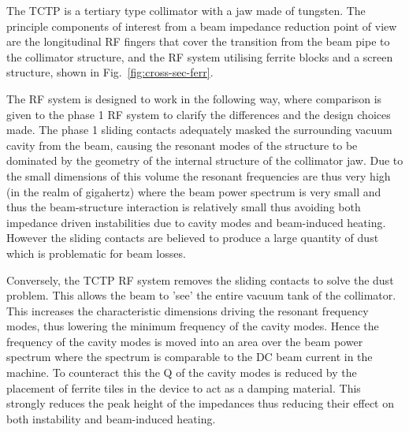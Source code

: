 The TCTP is a tertiary type collimator with a jaw made of tungsten. The principle components of interest from a beam impedance reduction point of view are the longitudinal RF fingers that cover the transition from the beam pipe to the collimator structure, and the RF system utilising ferrite blocks and a screen structure, shown in Fig.~\ref{fig:cross-sec-ferr}.

The RF system is designed to work in the following way, where comparison is given to the phase 1 RF system to clarify the differences and the design choices made. The phase 1 sliding contacts adequately masked the surrounding vacuum cavity from the beam, causing the resonant modes of the structure to be dominated by the geometry of the internal structure of the collimator jaw. Due to the small dimensions of this volume the resonant frequencies are thus very high (in the realm of gigahertz) where the beam power spectrum is very small and thus the beam-structure interaction is relatively small thus avoiding both impedance driven instabilities due to cavity modes and beam-induced heating. However the sliding contacts are believed to produce a large quantity of dust which is problematic for beam losses.

Conversely, the TCTP RF system removes the sliding contacts to solve the dust problem. This allows the beam to 'see' the entire vacuum tank of the collimator. This increases the characteristic dimensions driving the resonant frequency modes, thus lowering the minimum frequency of the cavity modes. Hence the frequency of the cavity modes is moved into an area over the beam power spectrum where the spectrum is comparable to the DC beam current in the machine. To counteract this the Q of the cavity modes is reduced by the placement of ferrite tiles in the device to act as a damping material. This strongly reduces the peak height of the impedances thus reducing their effect on both instability and beam-induced heating.